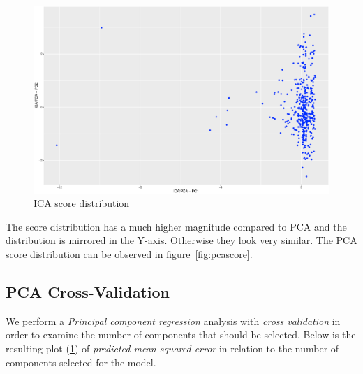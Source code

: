 \documentclass[a4paper,12pt]{article}
\begin{document}
        \begin{figure}[H]
            \centering
            \caption{ICA score distribution}
            \label{fig:icascores}
            \includegraphics[width=\textwidth]{share/A2_icascore.eps}
        \end{figure}

        The score distribution has a much higher magnitude compared to PCA and the distribution is mirrored in the Y-axis. Otherwise they look very similar. The PCA score distribution can be observed in figure~\ref{fig:pcascore}.
    \subsection*{PCA Cross-Validation}

 		We perform a \emph{Principal component regression} analysis with \emph{cross validation} in order to examine the number of components that should be selected. Below is the resulting plot (\ref{fig:icascores}) of \emph{predicted mean-squared error} in relation to the number of components selected for the model.
        
\end{document}
